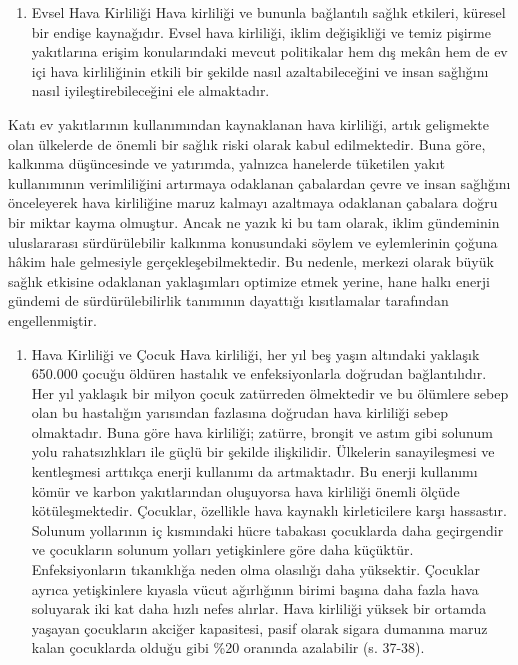 \documentclass[
]{book}
\providecommand{\tightlist}{%
  \setlength{\itemsep}{0pt}\setlength{\parskip}{0pt}}
\begin{document}
\begin{enumerate}
\def\labelenumi{\arabic{enumi})}
\setcounter{enumi}{1}
\tightlist
\item
  Evsel Hava Kirliliği
  Hava kirliliği ve bununla bağlantılı sağlık etkileri, küresel bir endişe kaynağıdır. Evsel hava kirliliği, iklim değişikliği ve temiz pişirme yakıtlarına erişim konularındaki mevcut politikalar hem dış mekân hem de ev içi hava kirliliğinin etkili bir şekilde nasıl azaltabileceğini ve insan sağlığını nasıl iyileştirebileceğini ele almaktadır. \citep{rao2013better}
\end{enumerate}

Katı ev yakıtlarının kullanımından kaynaklanan hava kirliliği, artık gelişmekte olan ülkelerde de önemli bir sağlık riski olarak kabul edilmektedir. Buna göre, kalkınma düşüncesinde ve yatırımda, yalnızca hanelerde tüketilen yakıt kullanımının verimliliğini artırmaya odaklanan çabalardan çevre ve insan sağlığını önceleyerek hava kirliliğine maruz kalmayı azaltmaya odaklanan çabalara doğru bir miktar kayma olmuştur. Ancak ne yazık ki bu tam olarak, iklim gündeminin uluslararası sürdürülebilir kalkınma konusundaki söylem ve eylemlerinin çoğuna hâkim hale gelmesiyle gerçekleşebilmektedir. Bu nedenle, merkezi olarak büyük sağlık etkisine odaklanan yaklaşımları optimize etmek yerine, hane halkı enerji gündemi de sürdürülebilirlik tanımının dayattığı kısıtlamalar tarafından engellenmiştir. \citep{goldemberg2018household}

\begin{enumerate}
\def\labelenumi{\arabic{enumi})}
\setcounter{enumi}{2}
\tightlist
\item
  Hava Kirliliği ve Çocuk
  Hava kirliliği, her yıl beş yaşın altındaki yaklaşık 650.000 çocuğu öldüren hastalık ve enfeksiyonlarla doğrudan bağlantılıdır. Her yıl yaklaşık bir milyon çocuk zatürreden ölmektedir ve bu ölümlere sebep olan bu hastalığın yarısından fazlasına doğrudan hava kirliliği sebep olmaktadır. Buna göre hava kirliliği; zatürre, bronşit ve astım gibi solunum yolu rahatsızlıkları ile güçlü bir şekilde ilişkilidir. Ülkelerin sanayileşmesi ve kentleşmesi arttıkça enerji kullanımı da artmaktadır. Bu enerji kullanımı kömür ve karbon yakıtlarından oluşuyorsa hava kirliliği önemli ölçüde kötüleşmektedir. Çocuklar, özellikle hava kaynaklı kirleticilere karşı hassastır. Solunum yollarının iç kısmındaki hücre tabakası çocuklarda daha geçirgendir ve çocukların solunum yolları yetişkinlere göre daha küçüktür. Enfeksiyonların tıkanıklığa neden olma olasılığı daha yüksektir. Çocuklar ayrıca yetişkinlere kıyasla vücut ağırlığının birimi başına daha fazla hava soluyarak iki kat daha hızlı nefes alırlar. Hava kirliliği yüksek bir ortamda yaşayan çocukların akciğer kapasitesi, pasif olarak sigara dumanına maruz kalan çocuklarda olduğu gibi \%20 oranında azalabilir (s. 37-38). \citep{bush2020}
\end{enumerate}
\end{document}
